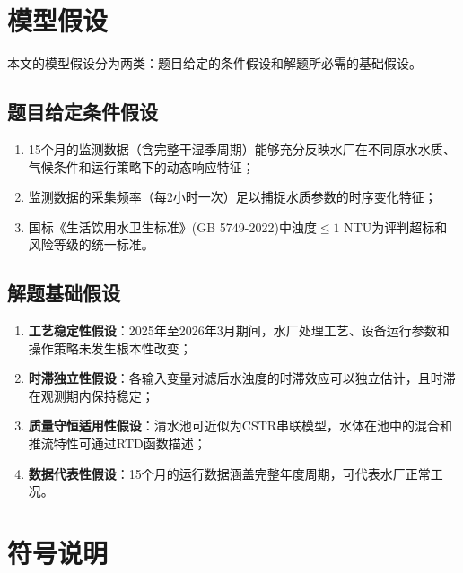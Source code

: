 \documentclass[12pt,a4paper]{ctexart}
\begin{document}
\section{模型假设}

本文的模型假设分为两类：题目给定的条件假设和解题所必需的基础假设。

\subsection{题目给定条件假设}

\begin{enumerate}[label=\textbf{A\arabic*：},nosep]
    \item 15个月的监测数据（含完整干湿季周期）能够充分反映水厂在不同原水水质、气候条件和运行策略下的动态响应特征；
    \item 监测数据的采集频率（每2小时一次）足以捕捉水质参数的时序变化特征；
    \item 国标《生活饮用水卫生标准》(GB 5749-2022)中浊度$\leq 1$ NTU为评判超标和风险等级的统一标准。
\end{enumerate}

\subsection{解题基础假设}

\begin{enumerate}[label=\textbf{B\arabic*：},nosep]
    \item \textbf{工艺稳定性假设}：2025年至2026年3月期间，水厂处理工艺、设备运行参数和操作策略未发生根本性改变；
    \item \textbf{时滞独立性假设}：各输入变量对滤后水浊度的时滞效应可以独立估计，且时滞在观测期内保持稳定；
    \item \textbf{质量守恒适用性假设}：清水池可近似为CSTR串联模型，水体在池中的混合和推流特性可通过RTD函数描述；
    \item \textbf{数据代表性假设}：15个月的运行数据涵盖完整年度周期，可代表水厂正常工况。
\end{enumerate}

\newpage
\section{符号说明}
\end{document}
